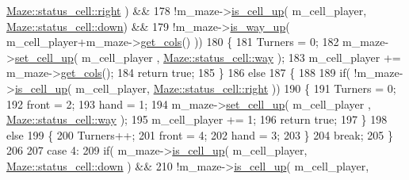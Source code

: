 \begin{DoxyCode}
      \hyperlink{classMaze_a07167e321eac2b67100fb82ecb98f1d1a7c4f29407893c334a6cb7a87bf045c0d}{Maze::status\_cell::right} ) &&
178                     !m\_maze->\hyperlink{classMaze_a2b0e69e72d6c3e1037578f057946a21e}{is\_cell\_up}( m\_cell\_player, 
      \hyperlink{classMaze_a07167e321eac2b67100fb82ecb98f1d1a74e8333ad11685ff3bdae589c8f6e34d}{Maze::status\_cell::down}) &&
179                     !m\_maze->\hyperlink{classMaze_a308fa695665de6217c0e7f28aab5adda}{is\_way\_up}( m\_cell\_player+m\_maze->\hyperlink{classMaze_a8a04cd1335e96a80358181afa164d4c9}{get\_cols}() ))
180             \{
181                 Turners = 0;
182                 m\_maze->\hyperlink{classMaze_aa7c832a91a3db8f48b31f688332f8986}{set\_cell\_up}( m\_cell\_player , 
      \hyperlink{classMaze_a07167e321eac2b67100fb82ecb98f1d1ac83b72dd001482ce10f0b106c7a0ed0e}{Maze::status\_cell::way} );
183                 m\_cell\_player += m\_maze->\hyperlink{classMaze_a8a04cd1335e96a80358181afa164d4c9}{get\_cols}();
184                 \textcolor{keywordflow}{return} \textcolor{keyword}{true};
185             \}
186             \textcolor{keywordflow}{else}
187             \{
188 
189                 \textcolor{keywordflow}{if}( !m\_maze->\hyperlink{classMaze_a2b0e69e72d6c3e1037578f057946a21e}{is\_cell\_up}( m\_cell\_player, 
      \hyperlink{classMaze_a07167e321eac2b67100fb82ecb98f1d1a7c4f29407893c334a6cb7a87bf045c0d}{Maze::status\_cell::right} ))
190                 \{
191                     Turners = 0;
192                     front = 2;
193                     hand = 1;
194                     m\_maze->\hyperlink{classMaze_aa7c832a91a3db8f48b31f688332f8986}{set\_cell\_up}( m\_cell\_player , 
      \hyperlink{classMaze_a07167e321eac2b67100fb82ecb98f1d1ac83b72dd001482ce10f0b106c7a0ed0e}{Maze::status\_cell::way} );
195                     m\_cell\_player += 1;
196                     \textcolor{keywordflow}{return} \textcolor{keyword}{true};
197                 \}
198                 \textcolor{keywordflow}{else}
199                 \{
200                     Turners++;
201                     front = 4;
202                     hand = 3;
203                 \}
204                 \textcolor{keywordflow}{break};
205             \}
206 
207         \textcolor{keywordflow}{case} 4:
209             \textcolor{keywordflow}{if}(     m\_maze->\hyperlink{classMaze_a2b0e69e72d6c3e1037578f057946a21e}{is\_cell\_up}( m\_cell\_player, 
      \hyperlink{classMaze_a07167e321eac2b67100fb82ecb98f1d1a74e8333ad11685ff3bdae589c8f6e34d}{Maze::status\_cell::down} ) &&
210                     !m\_maze->\hyperlink{classMaze_a2b0e69e72d6c3e1037578f057946a21e}{is\_cell\_up}( m\_cell\_player, 

\end{DoxyCode}
